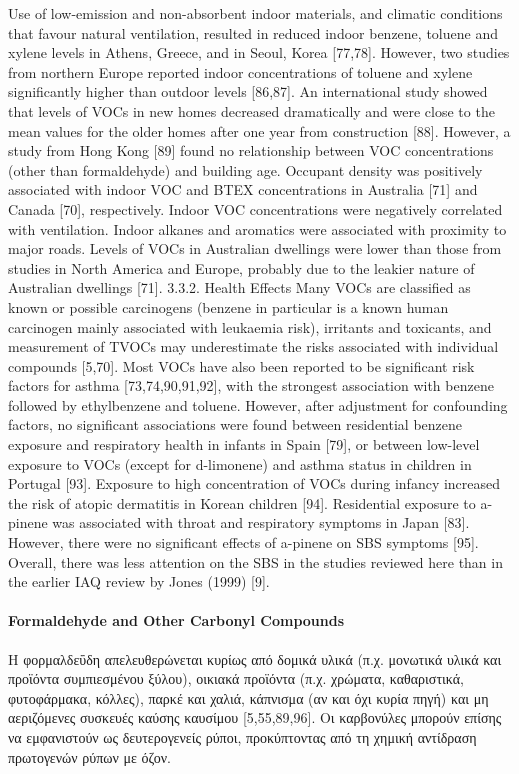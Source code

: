 Use of low-emission and non-absorbent indoor materials, and climatic conditions that favour natural ventilation, resulted in reduced indoor benzene, toluene and xylene levels in Athens, Greece, and in Seoul, Korea [77,78]. However, two studies from northern Europe reported indoor concentrations of toluene and xylene significantly higher than outdoor levels [86,87]. An international study showed that levels of VOCs in new homes decreased dramatically and were close to the mean values for the older homes after one year from construction [88]. However, a study from Hong Kong [89] found no relationship between VOC concentrations (other than formaldehyde) and building age.
Occupant density was positively associated with indoor VOC and BTEX concentrations in Australia [71] and Canada [70], respectively. Indoor VOC concentrations were negatively correlated with ventilation. Indoor alkanes and aromatics were associated with proximity to major roads. Levels of VOCs in Australian dwellings were lower than those from studies in North America and Europe, probably due to the leakier nature of Australian dwellings [71].
3.3.2. Health Effects
Many VOCs are classified as known or possible carcinogens (benzene in particular is a known human carcinogen mainly associated with leukaemia risk), irritants and toxicants, and measurement of TVOCs may underestimate the risks associated with individual compounds [5,70]. Most VOCs have also been reported to be significant risk factors for asthma [73,74,90,91,92], with the strongest association with benzene followed by ethylbenzene and toluene. However, after adjustment for confounding factors, no significant associations were found between residential benzene exposure and respiratory health in infants in Spain [79], or between low-level exposure to VOCs (except for d-limonene) and asthma status in children in Portugal [93]. Exposure to high concentration of VOCs during infancy increased the risk of atopic dermatitis in Korean children [94]. Residential exposure to a-pinene was associated with throat and respiratory symptoms in Japan [83]. However, there were no significant effects of a-pinene on SBS symptoms [95]. Overall, there was less attention on the SBS in the studies reviewed here than in the earlier IAQ review by Jones (1999) [9].


\paragraph{Formaldehyde and Other Carbonyl Compounds}

Η φορμαλδεΰδη απελευθερώνεται κυρίως από δομικά υλικά (π.χ. μονωτικά υλικά και προϊόντα συμπιεσμένου ξύλου), οικιακά προϊόντα (π.χ. χρώματα, καθαριστικά, φυτοφάρμακα, κόλλες), παρκέ και χαλιά, κάπνισμα (αν και όχι κυρία πηγή) και μη αεριζόμενες συσκευές καύσης καυσίμου [5,55,89,96]. Οι καρβονύλες μπορούν επίσης να εμφανιστούν ως δευτερογενείς ρύποι, προκύπτοντας από τη χημική αντίδραση πρωτογενών ρύπων με όζον.

